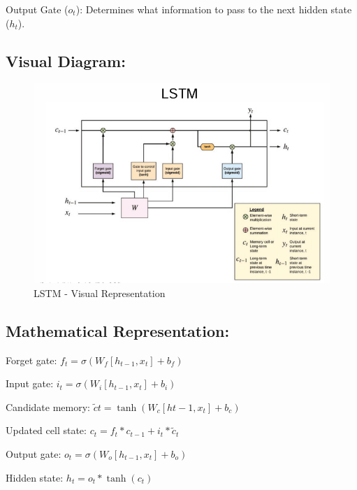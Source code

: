 \documentclass[
  letterpaper,
  DIV=11,
  numbers=noendperiod]{scrreprt}
\begin{document}
Output Gate (\(o_t\)): Determines what information to pass to the next
hidden state (\(h_t\)).

\subsection{Visual Diagram:}\label{visual-diagram}

\begin{figure}[H]

{\centering \includegraphics[width=0.8\linewidth,height=\textheight,keepaspectratio]{chapter11_lstm.png}

}

\caption{LSTM - Visual Representation}

\end{figure}%

\subsection{Mathematical
Representation:}\label{mathematical-representation-1}

Forget gate: \(f_t = \sigma(W_f[h_{t-1}, x_t] + b_f)\)

Input gate: \(i_t = \sigma(W_i[h_{t-1}, x_t] + b_i)\)

Candidate memory: \(\tilde{c}t = \tanh(W_c[h{t-1}, x_t] + b_c)\)

Updated cell state: \(c_t = f_t * c_{t-1} + i_t * \tilde{c}_t\)

Output gate: \(o_t = \sigma(W_o[h_{t-1}, x_t] + b_o)\)

Hidden state: \(h_t = o_t * \tanh(c_t)\)
\end{document}
